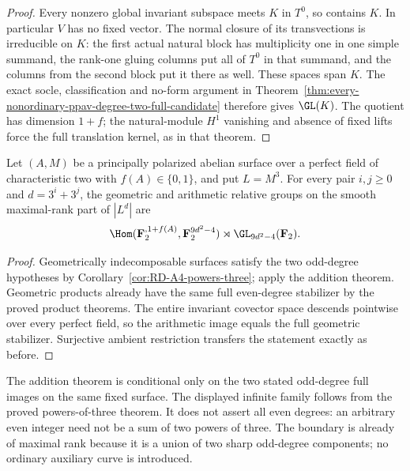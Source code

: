 \begin{proof}
Every nonzero global invariant subspace meets $K$ in $T^0$,
so contains $K$. In particular $V$ has no fixed vector. The
normal closure of its transvections is irreducible on $K$:
the first actual natural block has multiplicity one in one
simple summand, the rank-one gluing columns put all of $T^0$
in that summand, and the columns from the second block put
it there as well. These spaces span $K$. The exact socle,
classification and no-form argument in
Theorem~\ref{thm:every-nonordinary-ppav-degree-two-full-candidate}
therefore gives $\GL(K)$. The quotient has dimension $1+f$;
the natural-module $H^1$ vanishing and absence of fixed lifts
force the full translation kernel, as in that theorem.
\end{proof}

\begin{corollary}
\label{cor:nonordinary-even-three-power-sums-candidate}
Let $(A,M)$ be a principally polarized abelian surface over a
perfect field of characteristic two with $f(A)\in\{0,1\}$,
and put $L=M^3$. For every pair $i,j\ge0$ and
$d=3^i+3^j$, the geometric and arithmetic relative groups on
the smooth maximal-rank part of $|L^d|$ are
\[
 \Hom(\mathbf F_2^{,1+f(A)},\mathbf F_2^{9d^2-4})
                               \rtimes\GL_{9d^2-4}(\mathbf F_2).
\]
\end{corollary}
\begin{proof}
Geometrically indecomposable surfaces satisfy the two odd-degree
hypotheses by Corollary~\ref{cor:RD-A4-powers-three}; apply the
addition theorem. Geometric products already have the same
full even-degree stabilizer by the proved product theorems.
The entire invariant covector space descends pointwise over
every perfect field, so the arithmetic image equals the full
geometric stabilizer. Surjective ambient restriction transfers
the statement exactly as before.
\end{proof}

\begin{remark}[Scope]
\label{rem:nonordinary-even-addition-scope-candidate}
The addition theorem is conditional only on the two stated
odd-degree full images on the same fixed surface. The displayed
infinite family follows from the proved powers-of-three theorem.
It does not assert all even degrees: an arbitrary even integer
need not be a sum of two powers of three. The boundary is already
of maximal rank because it is a union of two sharp odd-degree
components; no ordinary auxiliary curve is introduced.
\end{remark}
